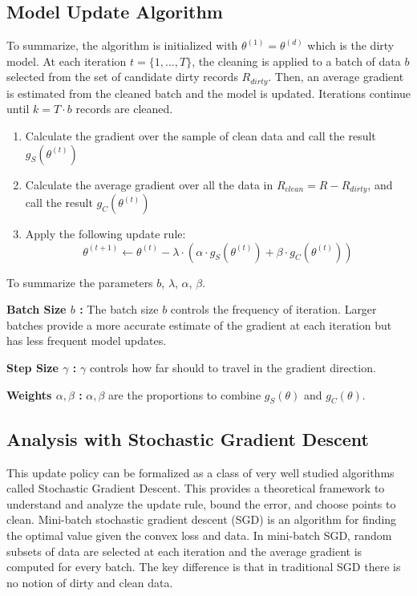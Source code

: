 \subsection{Model Update Algorithm}
To summarize, the algorithm is initialized with $\theta^{(1)} = \theta^{(d)}$ which is the dirty model.
At each iteration $t=\{1,...,T\}$, the cleaning is applied to a batch of data $b$ selected from the set of candidate dirty records $R_{dirty}$.
Then, an average gradient is estimated from the cleaned batch and the model is updated.
Iterations continue until $k = T \cdot b$ records are cleaned.

\begin{enumerate}[noitemsep]
	\item Calculate the gradient over the sample of clean data and call the result $g_S(\theta^{(t)})$
	\item Calculate the average gradient over all the data in $R_{clean}=R-R_{dirty}$, and call the result $g_C(\theta^{(t)})$
	\item Apply the following update rule:
	\[
	\theta^{(t+1)} \leftarrow \theta^{(t)} - \lambda \cdot(\alpha\cdot g_S(\theta^{(t)}) + \beta \cdot  g_C(\theta^{(t)}))
	\]
\end{enumerate} 

\noindent To summarize the parameters $b$, $\lambda$, $\alpha$, $\beta$.

\vspace{0.25em}

\noindent\textbf{Batch Size $b$ : } The batch size $b$ controls the frequency of iteration. Larger batches provide a more accurate estimate of the gradient at each iteration but has less frequent model updates. 

\vspace{0.25em}

\noindent\textbf{Step Size $\gamma$ : } $\gamma$ controls how far should to travel in the gradient direction.

\vspace{0.25em}

\noindent\textbf{Weights $\alpha,\beta$ : } $\alpha,\beta$ are the proportions to combine $g_S(\theta)$ and $g_C(\theta)$. 

\subsection{Analysis with Stochastic Gradient Descent}\label{sgd}
This update policy can be formalized as a class of very well studied algorithms called Stochastic Gradient Descent.
This provides a theoretical framework to understand and analyze the update rule, bound the error, and choose points to clean.
Mini-batch stochastic gradient descent (SGD) is an algorithm for finding the optimal value
given the convex loss and data.
In mini-batch SGD, random subsets of data are selected at each iteration and the average gradient is computed for every batch.
The key difference is that in traditional SGD there is no notion of dirty and clean data.

